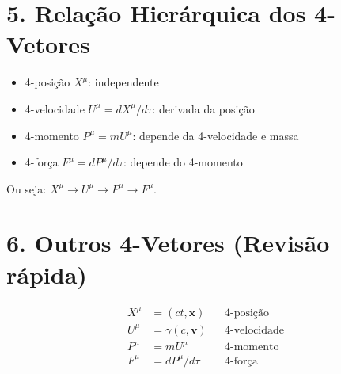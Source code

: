 \documentclass[a4paper,12pt]{article}
\begin{document}
\section*{5. Relação Hierárquica dos 4-Vetores}
\begin{itemize}
    \item 4-posição $X^\mu$: independente
    \item 4-velocidade $U^\mu = dX^\mu/d\tau$: derivada da posição
    \item 4-momento $P^\mu = m U^\mu$: depende da 4-velocidade e massa
    \item 4-força $F^\mu = dP^\mu/d\tau$: depende do 4-momento
\end{itemize}
Ou seja: $X^\mu \to U^\mu \to P^\mu \to F^\mu$.

\section*{6. Outros 4-Vetores (Revisão rápida)}
\begin{align*}
X^\mu &= (ct, \mathbf{x}) && \text{4-posição}\\
U^\mu &= \gamma(c, \mathbf{v}) && \text{4-velocidade}\\
P^\mu &= m U^\mu && \text{4-momento}\\
F^\mu &= dP^\mu/d\tau && \text{4-força}
\end{align*}
\end{document}

